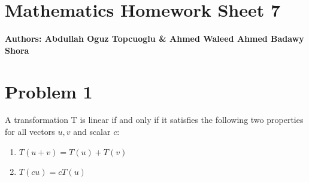 \documentclass{article}
\begin{document}
\section*{\huge Mathematics Homework Sheet 7}
\begin{flushright}
   \textbf{Authors: Abdullah Oguz Topcuoglu \& Ahmed Waleed Ahmed Badawy Shora}
\end{flushright}

\section*{Problem 1}


A transformation T is linear if and only if it satisfies the following two properties for all vectors \( u, v \) and scalar \( c \):
\begin{enumerate}
    \item \( T(u + v) = T(u) + T(v) \)
    \item \( T(cu) = cT(u) \)
\end{enumerate}
\end{document}
